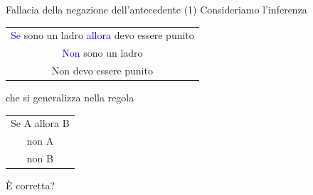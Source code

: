 \documentclass[aspectratio=169,10pt]{beamer}
\newcommand{\conn}[1]{\textcolor{blue}{#1}}
\newenvironment{inference}{\begin{tabular}{c}}{\end{tabular}}
\begin{document}
\begin{frame}{Fallacia della negazione dell'antecedente (1)}
	Consideriamo l'inferenza
	\begin{center}
		\begin{inference}
			\conn{Se} sono un ladro \conn{allora} devo essere punito\\
			\conn{Non} sono un ladro\\
			\hline
			Non devo essere punito
		\end{inference}
	\end{center}
	\pause
    che si generalizza nella regola
    \begin{center}
        \begin{inference}
            Se A allora B\\
            non A\\
            \hline
            non B
        \end{inference}
    \end{center}
	È corretta?
\end{frame}
\end{document}
